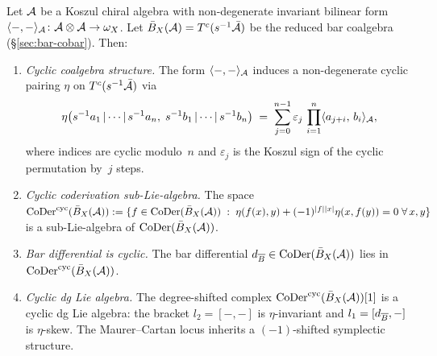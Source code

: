 \begin{proposition}\label{prop:genus0-cyclic-coderivation}
Let $\mathcal{A}$ be a Koszul chiral algebra with non-degenerate
invariant bilinear form
$\langle{-},{-}\rangle_{\mathcal{A}}\colon \mathcal{A}\otimes\mathcal{A}\to\omega_X$.
Let $\bar{B}_X(\mathcal{A}) = T^c(s^{-1}\bar{\mathcal{A}})$ be the reduced bar
coalgebra
\textup{(}\S\textup{\ref{sec:bar-cobar}}\textup{)}.
Then:
\begin{enumerate}[label=\textup{(\roman*)}]
\item \emph{Cyclic coalgebra structure.}
  The form $\langle{-},{-}\rangle_{\mathcal{A}}$ induces a non-degenerate
  cyclic pairing $\eta$ on $T^c(s^{-1}\bar{\mathcal{A}})$ via
  \begin{equation}\label{eq:cyclic-coalgebra-pairing}
  \eta\bigl(s^{-1}a_1\,|\cdots|\,s^{-1}a_n,\;
  s^{-1}b_1\,|\cdots|\,s^{-1}b_n\bigr)
  \;=\;
  \sum_{j=0}^{n-1}\varepsilon_j\,
  \prod_{i=1}^{n}
  \langle a_{j+i},\,b_i\rangle_{\mathcal{A}},
  \end{equation}
  where indices are cyclic modulo~$n$ and $\varepsilon_j$ is
  the Koszul sign of the cyclic permutation by~$j$ steps.

\item \emph{Cyclic coderivation sub-Lie-algebra.}
  The space
  $\operatorname{CoDer}^{\mathrm{cyc}}(\bar{B}_X(\mathcal{A}))
  := \{f\in\operatorname{CoDer}(\bar{B}_X(\mathcal{A}))\;:\;
  \eta(f(x),y)+(-1)^{|f||x|}\eta(x,f(y))=0\;\forall\,x,y\}$
  is a sub-Lie-algebra of
  $\operatorname{CoDer}(\bar{B}_X(\mathcal{A}))$.

\item \emph{Bar differential is cyclic.}
  The bar differential $d_{\overline{B}}\in
  \operatorname{CoDer}(\bar{B}_X(\mathcal{A}))$ lies in
  $\operatorname{CoDer}^{\mathrm{cyc}}(\bar{B}_X(\mathcal{A}))$.

\item \emph{Cyclic dg Lie algebra.}
  The degree-shifted complex
  $\operatorname{CoDer}^{\mathrm{cyc}}(\bar{B}_X(\mathcal{A}))[1]$
  is a cyclic dg Lie algebra: the bracket $l_2 = [-,-]$
  is $\eta$-invariant and $l_1 = [d_{\overline{B}},-]$ is
  $\eta$-skew.  The Maurer--Cartan locus inherits a
  $(-1)$-shifted symplectic structure.
\end{enumerate}
\end{proposition}

